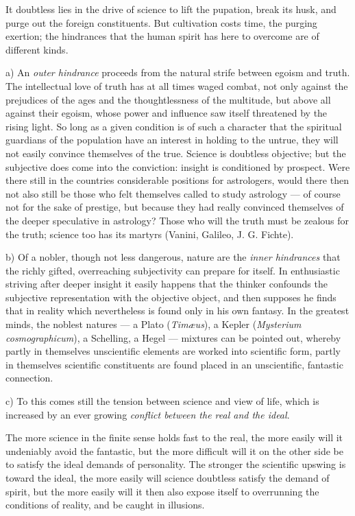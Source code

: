 \documentclass[12pt]{book}
\begin{document}
It doubtless lies in the drive of science to lift the pupation, break its husk, and
purge out the foreign constituents. But cultivation costs time, the purging exertion;
the hindrances that the human spirit has here to overcome are of different kinds.

a) An \emph{outer hindrance} proceeds from the natural strife between egoism and truth.
The intellectual love of truth has at all times waged combat, not only against the
prejudices of the ages and the thoughtlessness of the multitude, but above all against
their egoism, whose power and influence saw itself threatened by the rising light. So
long as a given condition is of such a character that the spiritual guardians of the
population have an interest in holding to the untrue, they will not easily convince
themselves of the true. Science is doubtless objective; but the subjective does come
into the conviction: insight is conditioned by prospect. Were there still in the
countries considerable positions for astrologers, would there then not also still be
those who felt themselves called to study astrology — of course not for the sake of
prestige, but because they had really convinced themselves of the deeper speculative in
astrology? Those who will the truth must be zealous for the truth; science too has its
martyrs (Vanini, Galileo, J. G. Fichte).

b) Of a nobler, though not less dangerous, nature are the \emph{inner hindrances} that
the richly gifted, overreaching
subjectivity can prepare for itself. In enthusiastic striving after deeper insight it
easily happens that the thinker confounds the subjective representation with the
objective object, and then supposes he finds that in reality which nevertheless is
found only in his own fantasy. In the greatest minds, the noblest natures — a Plato
(\textit{Timæus}), a Kepler (\textit{Mysterium cosmographicum}), a Schelling, a Hegel —
mixtures can be pointed out, whereby partly in themselves unscientific elements are
worked into scientific form, partly in themselves scientific constituents are found
placed in an unscientific, fantastic connection.

c) To this comes still the tension between science and view of life, which is increased
by an ever growing \emph{conflict between the real and the ideal}.

The more science in the finite sense holds fast to the real, the more easily will it
undeniably avoid the fantastic, but the more difficult will it on the other side be to
satisfy the ideal demands of personality. The stronger the scientific upswing is toward
the ideal, the more easily will science doubtless satisfy the demand of spirit, but the
more easily will it then also expose itself to overrunning the conditions of reality,
and be caught in illusions.
\end{document}
